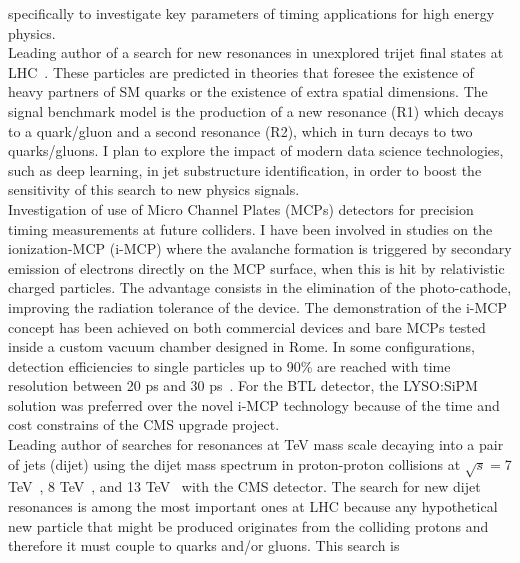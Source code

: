 \documentclass[10pt, a4paper]{article}
\newcommand{\years}[1]{\marginnote{\hskip-0.2in{\scriptsize #1}}}
\begin{document}
specifically to investigate key parameters of timing applications for
high energy physics.\\ [1em] 
\years{09/2018 - 07/2022} Leading author of a search for new resonances in
unexplored trijet final states at LHC~\cite{CMS:2022tqn,AN-19-273}. These
particles are predicted in theories that foresee the existence of
heavy partners of SM quarks or the existence of extra spatial
dimensions. The signal benchmark model is the production of a new resonance (R1)
which decays to a quark/gluon and a second resonance (R2), which in
turn decays to two quarks/gluons. I plan to explore the impact of
modern data science technologies, such as deep learning, in jet substructure identification, in order to boost the sensitivity of this search to new physics signals.\\ [1em] 
\years{03/2014 - 09/2017} Investigation of use of Micro Channel Plates
(MCPs) detectors for precision timing measurements at future colliders. I have been
involved in studies on the ionization-MCP (i-MCP) where the
avalanche formation is triggered by secondary emission of electrons
directly on the MCP surface, when this is hit by relativistic charged
particles. The advantage consists in the elimination of the
photo-cathode, improving the radiation tolerance of the device. The
demonstration of the i-MCP concept has been achieved on both
commercial devices and bare MCPs tested inside a custom vacuum  
chamber designed in Rome. In some configurations, detection
efficiencies to single particles up to 90\% are reached with time
resolution between 20 ps and 30
ps~\cite{Brianza:2015jia,Barnyakov:2017twj,Barnyakov:2017tak,Barnyakov:2017yrj,Barnyakov:2017qnb}. 
For the BTL detector, the LYSO:SiPM solution was preferred over the 
novel i-MCP technology because of the time and cost constrains 
of the CMS upgrade project. \\ [1em]
\years{09/2011 - 09/2018}Leading author of searches for resonances at
TeV mass scale decaying into a pair of jets (dijet) using the dijet mass spectrum 
in proton-proton collisions at $\sqrt{s}=$7 TeV~\cite{CMS:2012yf,AN-12-012}, 8
TeV~\cite{Chatrchyan:2013qha,AN-12-229,Khachatryan:2015sja,AN-12-455},
and 13 TeV~\cite{Sirunyan:2016iap,AN-16-202,Khachatryan:2015dcf,AN-15-063,AN-15-175} with the CMS
detector. The search for new dijet resonances is among the most important ones at LHC because any hypothetical new
particle that might be produced originates from the colliding protons
and therefore it must couple to quarks and/or gluons. This search is
\end{document}
